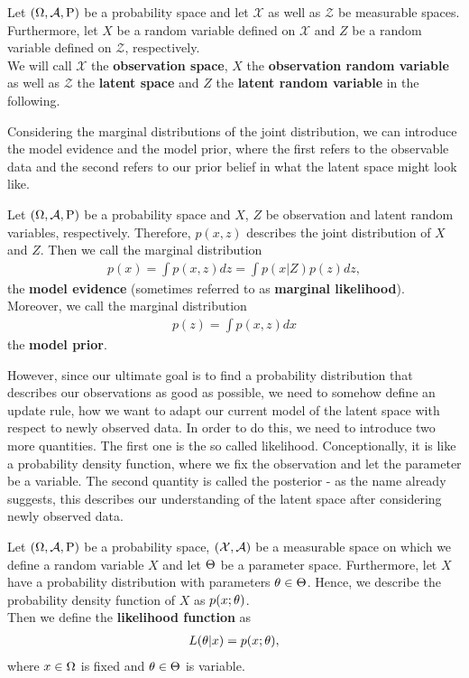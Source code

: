 \begin{definition}\label{def:spaces}
Let $(\Omega, \operatorname{\mathcal{A}}, \operatorname{\text{P}})$ be a probability space and let $\mathcal{X}$ as well as $\mathcal{Z}$ be measurable spaces. Furthermore, let $X$ be a random variable defined on $\mathcal{X}$ and $Z$ be a random variable defined on $\mathcal{Z}$, respectively.\\
We will call $\mathcal{X}$ the \textbf{observation space}, $X$ the \textbf{observation random variable} as well as $\mathcal{Z}$ the \textbf{latent space} and $Z$ the \textbf{latent random variable} in the following.
\end{definition}

Considering the marginal distributions of the joint distribution, we can introduce the model evidence and the model prior, where the first refers to the observable data and the second refers to our prior belief in what the latent space might look like.

\begin{definition}
Let $(\Omega, \operatorname{\mathcal{A}}, \operatorname{\text{P}})$ be a probability space and $X$, $Z$ be observation and latent random variables, respectively. Therefore, $p(x, z)$ describes the joint distribution of $X$ and $Z$. Then we call the marginal distribution
\begin{align*}
p(x) = \int p(x, z) dz = \int p(x|Z) p(z) dz,
\end{align*}
the \textbf{model evidence} (sometimes referred to as \textbf{marginal likelihood}).\\
Moreover, we call the marginal distribution
\begin{align*}
p(z) = \int p(x,z)dx
\end{align*}
the \textbf{model prior}.
\end{definition}

However, since our ultimate goal is to find a probability distribution that describes our observations as good as possible, we need to somehow define an update rule, how we want to adapt our current model of the latent space with respect to newly observed data. In order to do this, we need to introduce two more quantities. The first one is the so called likelihood. Conceptionally, it is like a probability density function, where we fix the observation and let the parameter be a variable. The second quantity is called the posterior - as the name already suggests, this describes our understanding of the latent space after considering newly observed data.

\begin{definition}\label{def:likelihood}
Let $(\Omega,\operatorname{\mathcal{A}}, \operatorname{\text{P}})$ be a probability space, $(\mathcal{X}, \operatorname{\mathcal{A}})$ be a measurable space on which we define a random variable $X$ and let $\operatorname{\Theta}$ be a parameter space. Furthermore, let $X$ have a probability distribution with parameters $\theta\in\operatorname{\Theta}$. Hence, we describe the probability density function of $X$ as $p(x;\theta)$.\\
Then we define the \textbf{likelihood function} as
\begin{align*}
L(\theta | x) = p(x; \theta),
\end{align*}
where $x\in\Omega$ is fixed and $\theta\in\operatorname{\Theta}$ is variable.
\end{definition}

